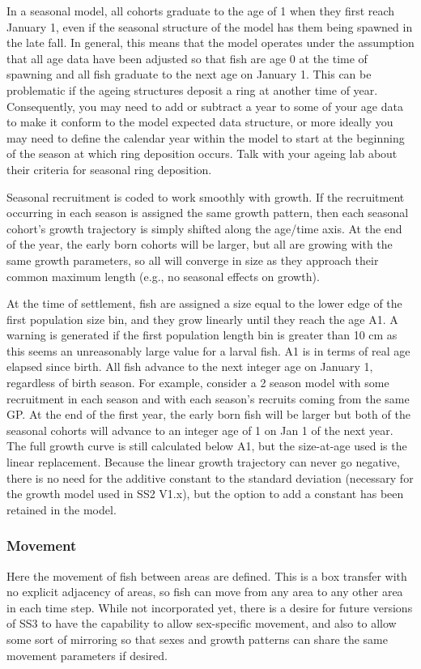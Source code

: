 In a seasonal model, all cohorts graduate to the age of 1 when they first reach January 1, even if the seasonal structure of the model has them being spawned in the late fall. In general, this means that the model operates under the assumption that all age data have been adjusted so that fish are age 0 at the time of spawning and all fish graduate to the next age on January 1. This can be problematic if the ageing structures deposit a ring at another time of year. Consequently, you may need to add or subtract a year to some of your age data to make it conform to the model expected data structure, or more ideally you may need to define the calendar year within the model to start at the beginning of the season at which ring deposition occurs. Talk with your ageing lab about their criteria for seasonal ring deposition.
		
Seasonal recruitment is coded to work smoothly with growth. If the recruitment occurring in each season is assigned the same growth pattern, then each seasonal cohort's growth trajectory is simply shifted along the age/time axis. At the end of the year, the early born cohorts will be larger, but all are growing with the same growth parameters, so all will converge in size as they approach their common maximum length (e.g., no seasonal effects on growth).
	
At the time of settlement, fish are assigned a size equal to the lower edge of the first population size bin, and they grow linearly until they reach the age A1. A warning is generated if the first population length bin is greater than 10 cm as this seems an unreasonably large value for a larval fish. A1 is in terms of real age elapsed since birth. All fish advance to the next integer age on January 1, regardless of birth season. For example, consider a 2 season model with some recruitment in each season and with each season's recruits coming from the same GP. At the end of the first year, the early born fish will be larger but both of the seasonal cohorts will advance to an integer age of 1 on Jan 1 of the next year. The full growth curve is still calculated below A1, but the size-at-age used is the linear replacement. Because the linear growth trajectory can never go negative, there is no need for the additive constant to the standard deviation (necessary for the growth model used in SS2 V1.x), but the option to add a constant has been retained in the model.

\subsubsection{Movement}
Here the movement of fish between areas are defined. This is a box transfer with no explicit adjacency of areas, so fish can move from any area to any other area in each time step. While not incorporated yet, there is a desire for future versions of SS3 to have the capability to allow sex-specific movement, and also to allow some sort of mirroring so that sexes and growth patterns can share the same movement parameters if desired.

